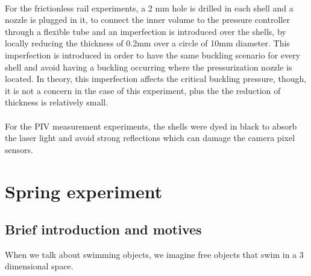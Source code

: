 \paragraph{}
For the frictionless rail experiments, a 2 mm hole is drilled in each shell and a nozzle is plugged in it, to connect the inner volume to the pressure controller through a flexible tube and an imperfection is introduced over the shells, by locally reducing the thickness of 0.2mm over a circle of 10mm diameter. This imperfection is introduced in order to have the same buckling scenario for every shell and avoid having a buckling occurring where the pressurization nozzle is located.
In theory, this imperfection affects the critical buckling pressure\cite{Preis}, though, it is not a concern in the case of this experiment, plus the the reduction of thickness is relatively small.
\paragraph{}
For the PIV measurement experiments, the shells were dyed in black to absorb the laser light and avoid strong reflections which can damage the camera pixel sensors.

\newpage
\section{Spring experiment}
\subsection{Brief introduction and motives}
When we talk about swimming objects, we imagine free objects that swim in a 3 dimensional space. 
